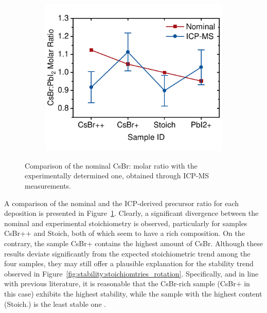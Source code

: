 \begin{figure}[htbp]
    \centering
    \begin{subfigure}[t]{0.65\textwidth}
        \centering
        \includegraphics[width=\textwidth]{chapters/stability/imeges/Stability-ICP-MS.pdf} %
    \end{subfigure}

    \caption[Comparison of the nominal CsBr: molar ratio with the experimentally determined one, obtained through ICP-MS measurements.]{Comparison of the nominal CsBr: molar ratio with the experimentally determined one, obtained through ICP-MS measurements.}
    \label{fig:stability:icp_ms}
\end{figure}

A comparison of the nominal and the ICP-derived precursor ratio for each deposition is presented in Figure~\ref{fig:stability:icp_ms}. Clearly, a significant divergence between the nominal and experimental stoichiometry is observed, particularly for samples CsBr++ and Stoich, both of which seem to have a  rich composition. On the contrary, the sample CsBr+ contains the highest amount of CsBr. Although these results deviate significantly from the expected stoichiometric trend among the four samples, they may still offer a plausible explanation for the stability trend observed in Figure~\ref{fig:stability:stoichiomtries_rotation}. Specifically, and in line with previous literature, it is reasonable that the CsBr-rich sample (CsBr+ in this case) exhibits the highest stability, while the sample with the highest  content (Stoich.) is the least stable one \cite{Ma2017TheCells}.

